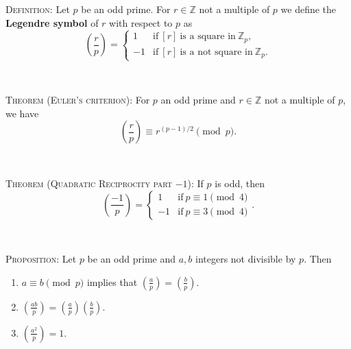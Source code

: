 \documentclass[12pt]{amsart}
\newcommand{\Z}{\mathbb{Z}}
\begin{document}
\begin{framed}
\noindent\textsc{Definition:} Let $p$ be an odd prime. For $r\in \Z$ not a multiple of $p$ we define the \textbf{Legendre symbol}  of $r$ with respect to $p$ as 
\[ \left( \frac{r}{p} \right) = \begin{cases} 1 & \text{if} \ [r] \ \text{is a square in} \ \Z_p, \\ -1 & \text{if} \ [r] \ \text{is a not square in} \ \Z_p. \end{cases}\]

\

\noindent\textsc{Theorem (Euler's criterion):} For $p$ an odd prime and $r\in \Z$ not a multiple of $p$, we have
\[\displaystyle \left( \frac{r}{p} \right) \equiv r^{(p-1)/2} \pmod p.\]

\

\noindent\textsc{Theorem (Quadratic Reciprocity part $-1$):} If $p$ is odd, then
\[ \left( \frac{-1}{p} \right) = \begin{cases} 1 &\text{if} \ p\equiv 1 \pmod 4\\ -1 &\text{if} \ p\equiv 3 \pmod 4\end{cases}.\]



\


\noindent \textsc{Proposition:} Let $p$ be an odd prime and $a,b$ integers not divisible by $p$. Then
\begin{enumerate}
\item $\displaystyle a\equiv b \pmod{p}$ implies that $\displaystyle \left(\frac{a}{p}\right) = \left(\frac{b}{p}\right)$.

\vspace{2mm}

\item $\displaystyle\left(\frac{ab}{p}\right) = \left(\frac{a}{p}\right) \left(\frac{b}{p}\right)$.

\vspace{2mm}

\item $\displaystyle\left(\frac{a^2}{p}\right) = 1$.
\end{enumerate}

\end{framed}

\

\
\end{document}
